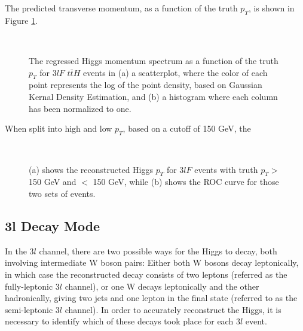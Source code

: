 The predicted transverse momentum, as a function of the truth $p_T$, is shown in Figure \ref{fig:pt3lFresults}.
                                                                                                                             
\begin{figure}[H]
    \centering
    \\                     
    \caption{The regressed Higgs momentum spectrum as a function of the truth $p_T$ for $3lF$ $t\bar{t}H$ events in (a) a scatterplot, where the color of each point represents the log of the point density, based on Gaussian Kernal Density Estimation, and (b) a histogram where each column  has been normalized to one.}
    \label{fig:pt3lFresults}
\end{figure}

When split into high and low $p_T$, based on a cutoff of 150 GeV, the 

\begin{figure}[H]                                                                                                           
    \centering
    \\
    \caption{(a) shows the reconstructed Higgs $p_T$ for $3lF$ events with truth $p_T > $ 150 GeV and $<$ 150 GeV, while (b) shows the ROC curve for those two sets of events.}
    \label{fig:pt3lFroc}
\end{figure}

\subsection{3l Decay Mode}
\label{sec:decay3l}

In the $3l$  channel, there are two possible ways for the Higgs to decay, both involving intermediate W boson pairs: Either both W bosons decay leptonically, in which case the reconstructed decay consists of two leptons (referred as the fully-leptonic $3l$  channel), or one W decays leptonically and the other hadronically, giving two jets and one lepton in the final state (referred to as the semi-leptonic $3l$  channel). In order to accurately reconstruct the Higgs, it is necessary to identify which of these decays took place for each $3l$  event.

